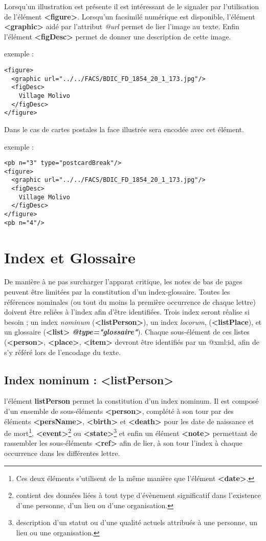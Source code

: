\documentclass[18pt,a4paper,oneside]{book} %
\begin{document}
Lorsqu'un illustration est présente il est intéressant de le signaler par l'utilisation de l'élément \textbf{<figure>}.
Lorsqu'un facsimilé numérique est disponible, l'élément \textbf{<graphic>} aidé par l'attribut \textit{\textit{@url}} permet de lier l'image au texte.
Enfin l'élément \textbf{<figDesc>} permet de donner une description de cette image.
\bigskip 

exemple : 
\begin{lstlisting}
<figure>
  <graphic url="../../FACS/BDIC_FD_1854_20_1_173.jpg"/>
  <figDesc>
    Village Molivo 
  </figDesc>
</figure>
\end{lstlisting}
\bigskip 

Dans le cas de cartes postales la face illustrée sera encodée avec cet élément. 
\bigskip 

exemple :
\begin{lstlisting}
<pb n="3" type="postcardBreak"/>
<figure>
  <graphic url="../../FACS/BDIC_FD_1854_20_1_173.jpg"/>
  <figDesc>
    Village Molivo
  </figDesc>
</figure>
<pb n="4"/>
\end{lstlisting}

\chapter{Index et Glossaire}

De manière à ne pas surcharger l'apparat critique, les notes de bas de pages peuvent être limitées par la constitution d'un index-glossaire.
Toutes les références nominales (ou tout du moins la première occurrence de chaque lettre) doivent être reliées à l'index afin d'être identifiées. Trois index seront réalise si besoin ; un index \textit{nominum} (\textbf{<listPerson>}), un index \textit{locorum}, (\textbf{<listPlace}), et un glossaire (\textbf{<list>} \textit{\textbf{@type="glossaire"}}).
Chaque sous-élément de ces listes (\textbf{<person>}, \textbf{<place>}, \textbf{<item>} devront être identifiés par un @xml:id, afin de s'y référé lors de l'encodage du texte.
\bigskip 

\section{Index nominum : <listPerson>}

l'élément \textbf{listPerson} permet la constitution d'un index nominum. Il est composé d'un ensemble de sous-éléments \textbf{<person>}, complété à son tour par des éléments \textbf{<persName>}, \textbf{<birth>} et \textbf{<death>} pour les date de naissance et de mort\footnote{Ces deux éléments s'utilisent de la même manière que l'élément \textbf{<date>}.}, \textbf{<event>}\footnote{contient des données liées à tout type d'évènement significatif dans l'existence d'une personne, d'un lieu ou d'une organisation.} ou \textbf{<state>}\footnote{description d'un statut ou d'une qualité actuels attribués à une personne, un lieu ou une organisation.} et enfin un élément \textbf{<note>} permettant de rassembler les sous-éléments \textbf{<ref>} afin de lier, à son tour l'index à chaque occurrence dans les différentes lettre.
\bigskip 
  
\end{document}
